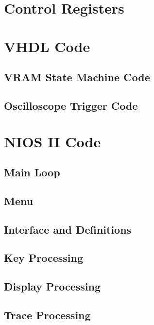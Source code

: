 \begin{appendices}
\chapter{Control Registers} \label{App:ctrlregs}



\chapter{VHDL Code} \label{App:vhdlcode}

\section{VRAM State Machine Code}


\newpage
\section{Oscilloscope Trigger Code}


\chapter{NIOS II Code} \label{App:niosiicode}

\section{Main Loop}


\newpage
\section{Menu}


\newpage
\section{Interface and Definitions}


\newpage
\section{Key Processing}


\newpage
\section{Display Processing}


\newpage
\section{Trace Processing}



\end{appendices}
